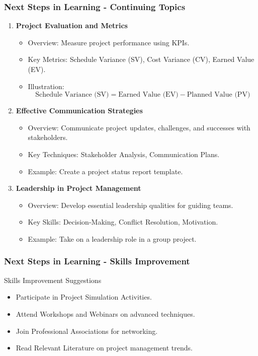 \documentclass[aspectratio=169]{beamer}
\begin{document}
\begin{frame}[fragile]
    \frametitle{Next Steps in Learning - Continuing Topics}
    \begin{enumerate}[resume]
        \item \textbf{Project Evaluation and Metrics}
            \begin{itemize}
                \item Overview: Measure project performance using KPIs.
                \item Key Metrics: Schedule Variance (SV), Cost Variance (CV), Earned Value (EV).
                \item Illustration: 
                \begin{equation}
                    \text{Schedule Variance (SV)} = \text{Earned Value (EV)} - \text{Planned Value (PV)}
                \end{equation}
            \end{itemize}
        \item \textbf{Effective Communication Strategies}
            \begin{itemize}
                \item Overview: Communicate project updates, challenges, and successes with stakeholders.
                \item Key Techniques: Stakeholder Analysis, Communication Plans.
                \item Example: Create a project status report template.
            \end{itemize}
        \item \textbf{Leadership in Project Management}
            \begin{itemize}
                \item Overview: Develop essential leadership qualities for guiding teams.
                \item Key Skills: Decision-Making, Conflict Resolution, Motivation.
                \item Example: Take on a leadership role in a group project.
            \end{itemize}
    \end{enumerate}
\end{frame}

\begin{frame}[fragile]
    \frametitle{Next Steps in Learning - Skills Improvement}
    \begin{block}{Skills Improvement Suggestions}
        \begin{itemize}
            \item Participate in Project Simulation Activities.
            \item Attend Workshops and Webinars on advanced techniques.
            \item Join Professional Associations for networking.
            \item Read Relevant Literature on project management trends.
        \end{itemize}
    \end{block}
\end{frame}
\end{document}
